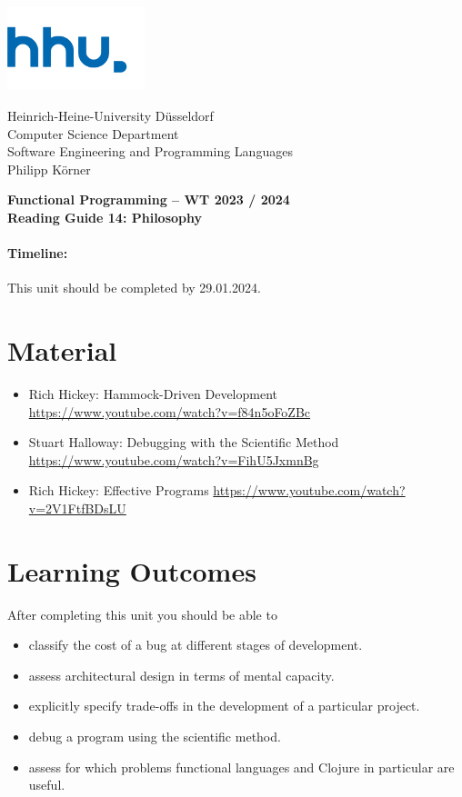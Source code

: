 \documentclass[11pt,a4paper]{article}
\begin{document}
\begin{minipage}[b]{\textwidth}
	\parbox[t]{5cm}{%
		\includegraphics[width=4cm]{unilogo}
		\hfill
	}
	\parbox[b]{11cm}{%
		Heinrich-Heine-University D\"usseldorf\\
		Computer Science Department\\
		Software Engineering and Programming Languages\\
		Philipp K\"orner
	}
\end{minipage}
\begin{center}
	\bf
	Functional Programming -- WT 2023 / 2024\\
	Reading Guide 14: Philosophy
\end{center}

\pagestyle{empty}

\paragraph{Timeline:} This unit should be completed by 29.01.2024.

\section{Material} 

\begin{itemize}
\item Rich Hickey: Hammock-Driven Development \url{https://www.youtube.com/watch?v=f84n5oFoZBc}
\item Stuart Halloway: Debugging with the Scientific Method \url{https://www.youtube.com/watch?v=FihU5JxmnBg}
\item Rich Hickey: Effective Programs \url{https://www.youtube.com/watch?v=2V1FtfBDsLU}
\end{itemize}


\section{Learning Outcomes}

After completing this unit you should be able to

\begin{itemize}
    \item classify the cost of a bug at different stages of development.
    \item assess architectural design in terms of mental capacity.
    \item explicitly specify trade-offs in the development of a particular project.
    \item debug a program using the scientific method.
    \item assess for which problems functional languages and Clojure in particular are useful.
\end{itemize}
\end{document}
